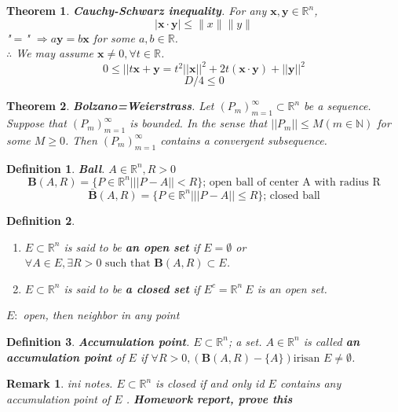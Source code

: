 \documentclass[a4paper,10pt]{article}
\newtheorem{remark}{Remark}
\newtheorem{theo}{Theorem}
\newtheorem{defi}{Definition}
\begin{document}
\begin{theo}
	\textbf{Cauchy-Schwarz inequality}. For any $ \mathbf{x}, \mathbf{y} \in \mathbb{R}^n $,
	\[ \mid \mathbf{x} \cdot \mathbf{y} \mid \leq \parallel x \parallel \parallel y \parallel \]
	"$ = $" $ \Rightarrow  a\mathbf{y} = b\mathbf{x}$ for some $ a,b \in \mathbb{R} $.\\
	$ \therefore $ We may assume $ \mathbf{x} \neq 0 , \forall t \in \mathbb{R} $.
	\[ 0 \leq ||t\mathbf{x}+\mathbf{y} = t^2||\mathbf{x}||^2+2t(\mathbf{x}\cdot\mathbf{y})+||\mathbf{y}||^2 \]
	\[D/4 \leq 0\]
\end{theo}

\begin{theo}
	\textbf{Bolzano=Weierstrass}. Let $ (P_{m})_{m=1}^{\infty} \subset \mathbb{R}^n $ be a sequence. Suppose that $ (P_{m})_{m=1}^{\infty} $ is bounded. In the sense that $ ||P_{m}|| \leq M (m \in \mathbb{N}) $ for some $ M \geq 0 $. Then $ (P_{m})_{m=1}^{\infty} $ contains a convergent subsequence.
\end{theo}

\begin{defi}
	\textbf{Ball}. $ A \in \mathbb{R}^n, R>0 $
	\[ \mathbf{B}(A,R) = \{ P \in \mathbb{R}^n | ||P-A||<R \} \text{; open ball of center A with radius R} \]
	\[ \bar{\mathbf{B}}(A,R) = \{ P \in \mathbb{R}^n | ||P-A||\leq R \} \text{; closed ball} \]
\end{defi}

\begin{defi}
	\begin{enumerate}
		\item $ E \subset \mathbb{R}^n $ is said to be \textbf{an open set} if $ E = \emptyset $ or $ \forall A \in E , \exists R>0 \text{ such that } \mathbf{B}(A,R) \subset E $.
		\item $ E \subset \mathbb{R}^n $ is said to be \textbf{a closed set} if $ E^{c} = \mathbb{R}^n \ E $ is an open set.
	\end{enumerate}
	$ E : $ open, then neighbor in any point %
\end{defi}

\begin{defi}
	\textbf{Accumulation point}. $ E \subset \mathbb{R}^n $; a set. $ A \in \mathbb{R}^n $ is called \textbf{an accumulation point} of $ E $ if $ \forall R>0, (\mathbf{B}(A,R)-\{A\}) \text{irisan } E \neq \emptyset $.
\end{defi}

\begin{remark}
	ini notes. $ E \subset \mathbb{R}^n $ is closed if and only id $ E $ contains any accumulation point of $ E $ . \textbf{Homework report, prove this}
\end{remark}
\end{document}
